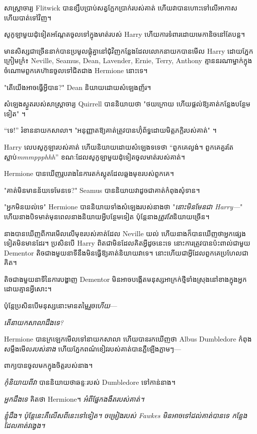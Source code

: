 សាស្ត្រាចារ្យ Flitwick បានខ្សឹបប្រាប់សត្វក្អែកប្រាក់របស់គាត់ ហើយវាបានហោះទៅលើអាកាស ហើយបាត់ទៅវិញ។

សូកូឡាមួយដុំទៀតអណ្តែតចូលទៅក្នុងមាត់របស់ Harry ហើយការទំពារដោយមេកានិចនៅតែបន្ត។

មានសិស្សជាច្រើននាក់បានប្រមូលផ្តុំគ្នានៅជុំវិញកន្លែងដែលលោកនាយកបានមើល Harry ដោយភ្នែកក្រៀមក្រំ៖ Neville, Seamus, Dean, Lavender, Ernie, Terry, Anthony គ្មាននរណាម្នាក់ក្នុងចំណោមពួកគេហ៊ានចូលទៅជិតជាង Hermione នោះទេ។

"តើយើងអាចធ្វើអ្វីបាន?" Dean និយាយដោយសំឡេងញ័រ។

សំឡេងស្ងួតរបស់សាស្រ្តាចារ្យ Quirrell បាននិយាយថា "ថយក្រោយ ហើយផ្តល់ឱ្យគាត់កន្លែងបន្ថែមទៀត" ។

“ទេ!” រំខាននាយកសាលា។ "អនុញ្ញាតឱ្យគាត់ត្រូវបានហ៊ុំព័ទ្ធដោយមិត្តភក្តិរបស់គាត់" ។

Harry លេបសូកូឡារបស់គាត់ ហើយនិយាយដោយសំឡេងទទេថា “ពួកគេល្ងង់។ ពួកគេគួរតែស្លាប់\emph{mmmppphhh}” ខណៈដែលសូកូឡាមួយដុំទៀតចូលមាត់របស់គាត់។

Hermione បាន​ឃើញ​រូបរាង​នៃ​ការ​តក់ស្លុត​ដែល​ឆ្លង​មុខ​របស់​ពួកគេ។

"គាត់មិនមានន័យទេមែនទេ?" Seamus បាននិយាយវាដូចជាគាត់កំពុងសុំទាន។

"អ្នកមិនយល់ទេ" Hermione បាននិយាយទាំងសំឡេងរបស់នាងថា "\emph{នោះមិនមែនជា Harry—}" ហើយនាងបិទមាត់មុនពេលនាងនិយាយអ្វីបន្ថែមទៀត ប៉ុន្តែនាង\emph{ត្រូវតែ}និយាយច្រើន។

នាង​បាន​ឃើញ​ពី​ការ​មើល​លើ​មុខ​របស់​គាត់​ដែល Neville យល់ ហើយ​នាង​ក៏​បាន​ឃើញ​ថា​អ្នក​ផ្សេង​ទៀត​មិន​មាន​ដែរ។ ប្រសិនបើ Harry ពិតជាមិនដែលគិតអ្វីដូចនេះទេ នោះការត្រូវបានប៉ះពាល់ជាមួយ Dementor តិចជាងមួយនាទីនឹងមិនធ្វើឱ្យគាត់និយាយវាទេ។ នោះហើយជាអ្វីដែលពួកគេប្រហែលជាគិត។

តិចជាងមួយនាទីនៃការបង្ហាញ Dementor មិនអាចបង្កើតមនុស្សអាក្រក់ថ្មីទាំងស្រុងនៅខាងក្នុងអ្នកដោយគ្មានអ្វីសោះ។

ប៉ុន្តែប្រសិនបើមនុស្សនោះមានតម្លៃ\emph{រួចហើយ}—

\emph{តើនាយកសាលាដឹងទេ?}

Hermione បានក្រឡេកមើលទៅនាយកសាលា ហើយបានរកឃើញថា Albus Dumbledore កំពុងសម្លឹងមើល\emph{របស់នាង} ហើយភ្នែកពណ៌ខៀវរបស់គាត់បានភ្លឺឡើងភ្លាមៗ—

ពាក្យ​បាន​ចូល​មក​ក្នុង​ចិត្ត​របស់​នាង។

\emph{កុំនិយាយពីវា} បាននិយាយថាឆន្ទៈរបស់ Dumbledore ទៅកាន់នាង។

\emph{អ្នកដឹងទេ} គិតថា Hermione។ \emph{អំពីផ្នែកងងឹតរបស់គាត់។}

\emph{ខ្ញុំដឹង។ ប៉ុន្តែនេះគឺលើសពីនេះទៅទៀត។ ចម្រៀងរបស់ Fawkes មិនអាចទៅដល់គាត់បានទេ កន្លែងដែលគាត់វង្វេង។}

